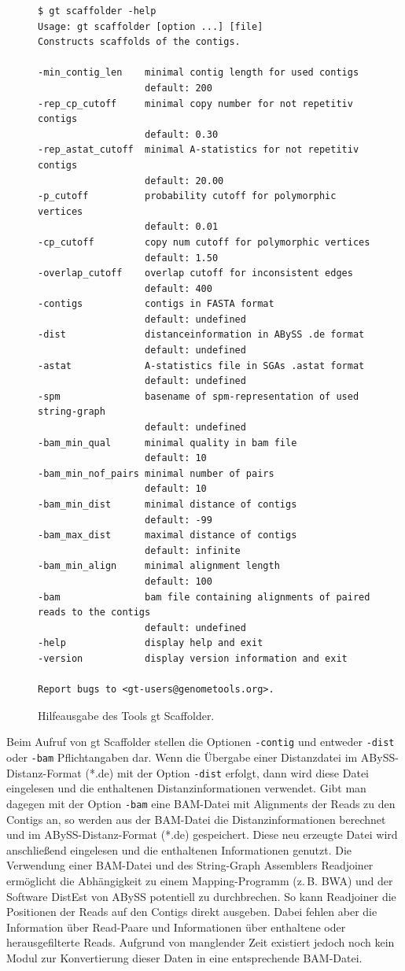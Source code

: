 \documentclass[a4paper,11pt,parskip,abstract=on]{scrartcl}
\begin{document}
\begin{figure}
\begin{verbatim}
$ gt scaffolder -help
Usage: gt scaffolder [option ...] [file]
Constructs scaffolds of the contigs.

-min_contig_len    minimal contig length for used contigs
                   default: 200
-rep_cp_cutoff     minimal copy number for not repetitiv contigs
                   default: 0.30
-rep_astat_cutoff  minimal A-statistics for not repetitiv contigs
                   default: 20.00
-p_cutoff          probability cutoff for polymorphic vertices
                   default: 0.01
-cp_cutoff         copy num cutoff for polymorphic vertices
                   default: 1.50
-overlap_cutoff    overlap cutoff for inconsistent edges
                   default: 400
-contigs           contigs in FASTA format
                   default: undefined
-dist              distanceinformation in ABySS .de format
                   default: undefined
-astat             A-statistics file in SGAs .astat format
                   default: undefined
-spm               basename of spm-representation of used string-graph
                   default: undefined
-bam_min_qual      minimal quality in bam file
                   default: 10
-bam_min_nof_pairs minimal number of pairs
                   default: 10
-bam_min_dist      minimal distance of contigs
                   default: -99
-bam_max_dist      maximal distance of contigs
                   default: infinite
-bam_min_align     minimal alignment length
                   default: 100
-bam               bam file containing alignments of paired reads to the contigs
                   default: undefined
-help              display help and exit
-version           display version information and exit

Report bugs to <gt-users@genometools.org>.
\end{verbatim}
\caption{\label{abb: help}Hilfeausgabe des Tools gt Scaffolder.}
\end{figure}

Beim Aufruf von gt Scaffolder stellen die Optionen \texttt{-contig} und
entweder \texttt{-dist} oder \texttt{-bam} Pflichtangaben dar. Wenn die
Übergabe einer Distanzdatei im ABySS-Distanz-Format (*.de) mit der Option
\texttt{-dist} erfolgt, dann wird diese Datei eingelesen und die enthaltenen
Distanzinformationen verwendet. Gibt man dagegen mit der Option \texttt{-bam}
eine BAM-Datei mit Alignments der Reads zu den Contigs an, so werden aus der
BAM-Datei die Distanzinformationen berechnet und im ABySS-Distanz-Format
(*.de) gespeichert. Diese neu erzeugte Datei wird anschließend eingelesen und
die enthaltenen Informationen genutzt. Die Verwendung einer BAM-Datei und des
String-Graph Assemblers Readjoiner ermöglicht die Abhängigkeit zu einem
Mapping-Programm (z.\,B. BWA) und der Software DistEst von ABySS potentiell zu
durchbrechen. So kann Readjoiner die Positionen der Reads auf den Contigs
direkt ausgeben. Dabei fehlen aber die Information über Read-Paare und
Informationen über enthaltene oder herausgefilterte Reads. Aufgrund von
manglender Zeit existiert jedoch noch kein Modul zur Konvertierung dieser
Daten in eine entsprechende BAM-Datei.
\end{document}
